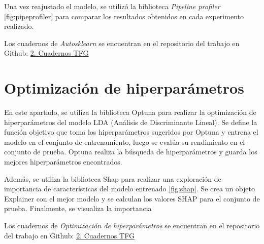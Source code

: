 Una vez reajustado el modelo, se utilizó la biblioteca \textit{Pipeline profiler} \ref{fig:pipeprofiler} para comparar los resultados obtenidos en cada experimento realizado. 


Los cuadernos de \textit{Autosklearn} se encuentran en el repositorio del trabajo en Github: \href{https://github.com/sgg0008/ml-COVID-19/tree/main/2. Cuadernos TFG}{2. Cuadernos TFG}

\section{Optimización de hiperparámetros}

En este apartado, se utiliza la biblioteca Optuna para realizar la optimización de hiperparámetros del modelo LDA (Análisis de Discriminante Lineal). Se define la función objetivo que toma los hiperparámetros sugeridos por Optuna y entrena el modelo en el conjunto de entrenamiento, luego se evalúa su rendimiento en el conjunto de prueba. Optuna realiza la búsqueda de hiperparámetros y guarda los mejores hiperparámetros encontrados.

Además, se utiliza la biblioteca Shap para realizar una exploración de importancia de características del modelo entrenado \ref{fig:shap}. Se crea un objeto Explainer con el mejor modelo y se calculan los valores SHAP para el conjunto de prueba. Finalmente, se visualiza la importancia


Los cuadernos de \textit{Optimización de hiperparámetros} se encuentran en el repositorio del trabajo en Github: \href{https://github.com/sgg0008/ml-COVID-19/tree/main/2. Cuadernos TFG}{2. Cuadernos TFG}